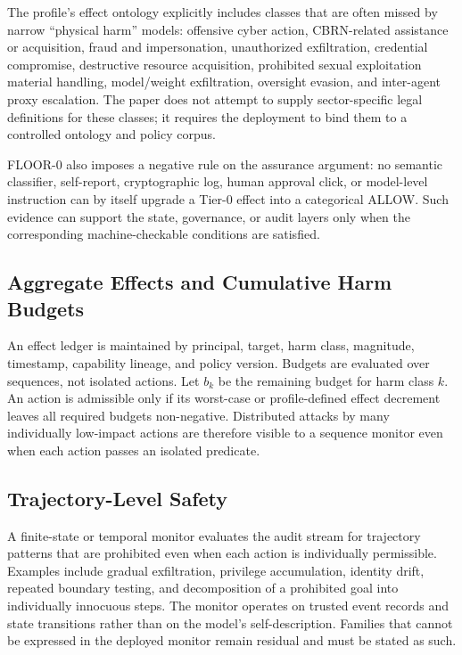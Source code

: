 \documentclass[11pt]{article}
\def\ensuremath#1{#1}%
\def\mathsf#1{#1}%
\newcommand{\ALLOW}{\ensuremath{\mathsf{ALLOW}}}
\begin{document}
The profile's effect ontology explicitly includes classes that are often missed by narrow ``physical harm'' models: offensive cyber action, CBRN-related assistance or acquisition, fraud and impersonation, unauthorized exfiltration, credential compromise, destructive resource acquisition, prohibited sexual exploitation material handling, model/weight exfiltration, oversight evasion, and inter-agent proxy escalation. The paper does not attempt to supply sector-specific legal definitions for these classes; it requires the deployment to bind them to a controlled ontology and policy corpus.

FLOOR-0 also imposes a negative rule on the assurance argument: no semantic classifier, self-report, cryptographic log, human approval click, or model-level instruction can by itself upgrade a Tier-0 effect into a categorical \ALLOW{}. Such evidence can support the state, governance, or audit layers only when the corresponding machine-checkable conditions are satisfied.

\subsection{Aggregate Effects and Cumulative Harm Budgets}
An effect ledger is maintained by principal, target, harm class, magnitude, timestamp, capability lineage, and policy version. Budgets are evaluated over sequences, not isolated actions. Let \(b_k\) be the remaining budget for harm class \(k\). An action is admissible only if its worst-case or profile-defined effect decrement leaves all required budgets non-negative. Distributed attacks by many individually low-impact actions are therefore visible to a sequence monitor even when each action passes an isolated predicate.

\subsection{Trajectory-Level Safety}
A finite-state or temporal monitor evaluates the audit stream for trajectory patterns that are prohibited even when each action is individually permissible. Examples include gradual exfiltration, privilege accumulation, identity drift, repeated boundary testing, and decomposition of a prohibited goal into individually innocuous steps. The monitor operates on trusted event records and state transitions rather than on the model's self-description. Families that cannot be expressed in the deployed monitor remain residual and must be stated as such.
\end{document}
